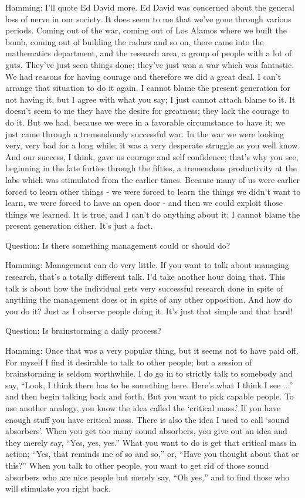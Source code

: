 \documentclass{article}
\begin{document}
Hamming: I'll quote Ed David more. Ed David was concerned about the general loss of nerve in our society. It does seem to me that we've gone through various periods. Coming out of the war, coming out of Los Alamos where we built the bomb, coming out of building the radars and so on, there came into the mathematics department, and the research area, a group of people with a lot of guts. They've just seen things done; they've just won a war which was fantastic. We had reasons for having courage and therefore we did a great deal. I can't arrange that situation to do it again. I cannot blame the present generation for not having it, but I agree with what you say; I just cannot attach blame to it. It doesn't seem to me they have the desire for greatness; they lack the courage to do it. But we had, because we were in a favorable circumstance to have it; we just came through a tremendously successful war. In the war we were looking very, very bad for a long while; it was a very desperate struggle as you well know. And our success, I think, gave us courage and self confidence; that's why you see, beginning in the late forties through the fifties, a tremendous productivity at the labs which was stimulated from the earlier times. Because many of us were earlier forced to learn other things - we were forced to learn the things we didn't want to learn, we were forced to have an open door - and then we could exploit those things we learned. It is true, and I can't do anything about it; I cannot blame the present generation either. It's just a fact.

Question: Is there something management could or should do?

Hamming: Management can do very little. If you want to talk about managing research, that's a totally different talk. I'd take another hour doing that. This talk is about how the individual gets very successful research done in spite of anything the management does or in spite of any other opposition. And how do you do it? Just as I observe people doing it. It's just that simple and that hard!

Question: Is brainstorming a daily process?

Hamming: Once that was a very popular thing, but it seems not to have paid off. For myself I find it desirable to talk to other people; but a session of brainstorming is seldom worthwhile. I do go in to strictly talk to somebody and say, ``Look, I think there has to be something here. Here's what I think I see ...'' and then begin talking back and forth. But you want to pick capable people. To use another analogy, you know the idea called the `critical mass.' If you have enough stuff you have critical mass. There is also the idea I used to call `sound absorbers'. When you get too many sound absorbers, you give out an idea and they merely say, ``Yes, yes, yes.'' What you want to do is get that critical mass in action; ``Yes, that reminds me of so and so,'' or, ``Have you thought about that or this?'' When you talk to other people, you want to get rid of those sound absorbers who are nice people but merely say, ``Oh yes,'' and to find those who will stimulate you right back.
\end{document}
